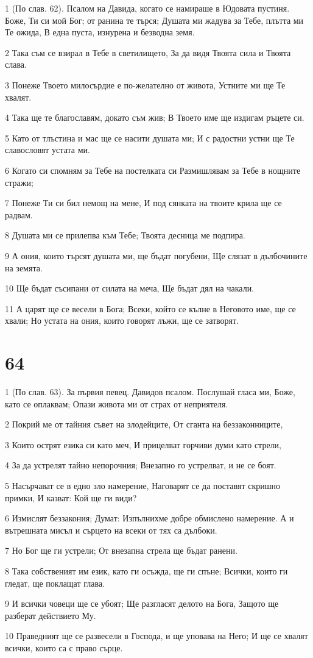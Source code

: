 \par 1 (По слав. 62). Псалом на Давида, когато се намираше в Юдовата пустиня. Боже, Ти си мой Бог; от ранина те търся; Душата ми жадува за Тебе, плътта ми Те ожида, В една пуста, изнурена и безводна земя.
\par 2 Така съм се взирал в Тебе в светилището, За да видя Твоята сила и Твоята слава.
\par 3 Понеже Твоето милосърдие е по-желателно от живота, Устните ми ще Те хвалят.
\par 4 Така ще те благославям, докато съм жив; В Твоето име ще издигам ръцете си.
\par 5 Като от тлъстина и мас ще се насити душата ми; И с радостни устни ще Те славословят устата ми.
\par 6 Когато си спомням за Тебе на постелката си Размишлявам за Тебе в нощните стражи;
\par 7 Понеже Ти си бил немощ на мене, И под сянката на твоите крила ще се радвам.
\par 8 Душата ми се прилепва към Тебе; Твоята десница ме подпира.
\par 9 А ония, които търсят душата ми, ще бъдат погубени, Ще слязат в дълбочините на земята.
\par 10 Ще бъдат съсипани от силата на меча, Ще бъдат дял на чакали.
\par 11 А царят ще се весели в Бога; Всеки, който се кълне в Неговото име, ще се хвали; Но устата на ония, които говорят лъжи, ще се затворят.

\chapter{64}

\par 1 (По слав. 63). За първия певец. Давидов псалом. Послушай гласа ми, Боже, като се оплаквам; Опази живота ми от страх от неприятеля.
\par 2 Покрий ме от тайния съвет на злодейците, От сганта на беззаконниците,
\par 3 Които острят езика си като меч, И прицелват горчиви думи като стрели,
\par 4 За да устрелят тайно непорочния; Внезапно го устрелват, и не се боят.
\par 5 Насърчават се в едно зло намерение, Наговарят се да поставят скришно примки, И казват: Кой ще ги види?
\par 6 Измислят беззакония; Думат: Изпълнихме добре обмислено намерение. А и вътрешната мисъл и сърцето на всеки от тях са дълбоки.
\par 7 Но Бог ще ги устрели; От внезапна стрела ще бъдат ранени.
\par 8 Така собственият им език, като ги осъжда, ще ги спъне; Всички, които ги гледат, ще поклащат глава.
\par 9 И всички човеци ще се убоят; Ще разгласят делото на Бога, Защото ще разберат действието Му.
\par 10 Праведният ще се развесели в Господа, и ще уповава на Него; И ще се хвалят всички, които са с право сърце.

